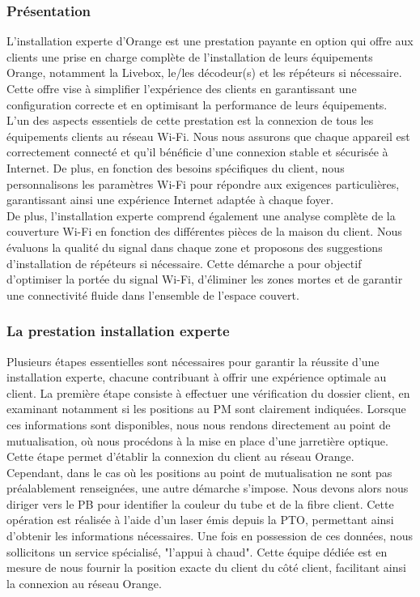 \documentclass[12pt, a4paper]{article}
\begin{document}
\subsubsection{Présentation}
L'installation experte d'Orange est une
prestation payante en option qui offre aux clients
une prise en charge complète de l'installation de leurs
équipements Orange, notamment la Livebox, le/les décodeur(s)
et les répéteurs si nécessaire. Cette offre vise à simplifier
l'expérience des clients en garantissant une configuration
correcte et en optimisant la performance de leurs équipements.\\

L'un des aspects essentiels de cette prestation est la
connexion de tous les équipements clients au réseau Wi-Fi.
Nous nous assurons que chaque appareil est
correctement connecté et qu'il bénéficie d'une connexion
stable et sécurisée à Internet. De plus, en fonction des besoins
spécifiques du client, nous personnalisons les paramètres Wi-Fi
pour répondre aux exigences particulières, garantissant ainsi
une expérience Internet adaptée à chaque foyer.\\

De plus, l'installation experte comprend également une analyse
complète de la couverture Wi-Fi en fonction des différentes
pièces de la maison du client. Nous évaluons
la qualité du signal dans chaque zone et proposons des
suggestions d'installation de répéteurs si nécessaire. Cette
démarche a pour objectif d'optimiser la portée du signal Wi-Fi,
d'éliminer les zones mortes et de garantir une connectivité fluide
dans l'ensemble de l'espace couvert.
\subsubsection{La prestation installation experte}
Plusieurs étapes essentielles sont nécessaires pour garantir
la réussite d'une installation experte, chacune contribuant à offrir
une expérience optimale au client. La première étape consiste à
effectuer une vérification du dossier client, en examinant notamment
si les positions au \gls{PM} sont clairement indiquées.
Lorsque ces informations sont disponibles, nous nous rendons
directement au point de mutualisation, où nous procédons à la
mise en place d'une jarretière optique. Cette étape permet d'établir
la connexion du client au réseau Orange.\\

Cependant, dans le cas où les positions au point de mutualisation ne
sont pas préalablement renseignées, une autre démarche s'impose.
Nous devons alors nous diriger vers le \gls{PB}
pour identifier la couleur du tube et de la fibre client.
Cette opération est réalisée à l'aide d'un laser émis depuis
la \gls{PTO}, permettant ainsi d'obtenir les
informations nécessaires. Une fois en possession de ces données,
nous sollicitons un service spécialisé, "l'appui à chaud". Cette
équipe dédiée est en mesure de nous fournir la position exacte du
client du côté client, facilitant ainsi la connexion au réseau Orange.\\
\end{document}
